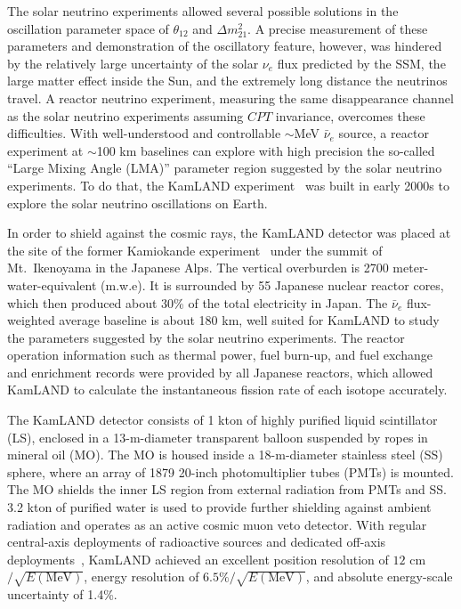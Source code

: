 \documentclass[aps,twocolumn,preprintnumbers,amsmath,superscriptaddress,amssymb,floats,nofootinbib]{revtex4-1}
\begin{document}
The solar neutrino experiments allowed several possible solutions in the oscillation parameter space of $\theta_{12}$ and $\Delta m^2_{21}$. 
A precise measurement of these parameters and demonstration of the oscillatory feature, however, was hindered by the relatively large uncertainty of the solar $\nu_{e}$ flux predicted by the SSM, the large matter effect inside the Sun, and the extremely long distance the neutrinos travel. 
A reactor neutrino experiment, measuring the same disappearance channel as the solar neutrino experiments assuming $CPT$ invariance, overcomes these difficulties. 
With well-understood and controllable $\sim$MeV $\bar\nu_e$ source, a reactor experiment at $\sim$100 km baselines can explore with high precision the so-called ``Large Mixing Angle (LMA)'' parameter region suggested by the solar neutrino experiments. To do that, the KamLAND experiment~\cite{Kamland03} was built in early 2000s to explore the solar neutrino oscillations on Earth.

In order to shield against the cosmic rays, the KamLAND detector was placed at the site of the former Kamiokande experiment~\cite{Kamiokande} under the summit of Mt.~Ikenoyama in the Japanese Alps. 
The vertical overburden is 2700 meter-water-equivalent (m.w.e). 
It is surrounded by 55 Japanese nuclear reactor cores, which then produced about 30\% of the total electricity in Japan. 
The $\bar\nu_e$ flux-weighted average baseline is about 180 km, well suited for KamLAND to study the parameters suggested by the solar neutrino experiments. 
The reactor operation information such as thermal power, fuel burn-up, and fuel exchange and enrichment records were provided by all Japanese reactors, which allowed KamLAND to calculate the instantaneous fission rate of each isotope accurately. 

The KamLAND detector consists of 1 kton of highly purified liquid scintillator (LS), enclosed in a 13-m-diameter transparent balloon suspended by ropes in mineral oil (MO). 
The MO is housed inside a 18-m-diameter stainless steel (SS) sphere, where an array of 1879 20-inch photomultiplier tubes (PMTs) is mounted. 
The MO shields the inner LS region from external radiation from PMTs and SS. 
3.2 kton of purified water is used to provide further shielding against ambient radiation and operates as an active cosmic muon veto detector. 
With regular central-axis deployments of radioactive sources and dedicated off-axis deployments~\cite{KamLAND-4pi}, KamLAND achieved an excellent position resolution of $12$ cm$/\sqrt{E(\textrm{MeV})}$, energy resolution of $6.5\%/\sqrt{E(\textrm{MeV})}$, and absolute energy-scale uncertainty of 1.4\%.
\end{document}
